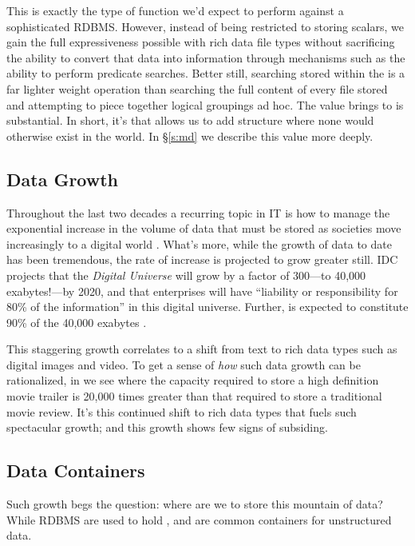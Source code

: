 This is exactly the type of function we'd expect to perform against a sophisticated RDBMS. However, instead of being restricted to storing scalars, we gain the full expressiveness possible with rich data file types without sacrificing the ability to convert that data into information through mechanisms such as the ability to perform predicate searches. Better still, searching \md{} stored within the \os{} is a far lighter weight operation than searching the full content of every file stored and attempting to piece together logical groupings ad hoc. The value \md{} brings to \ud{} is substantial. In short, it's \md{} that allows us to add structure where none would otherwise exist in the \ud{} world. In \S\ref{s:md} we describe this value more deeply.

\subsection{Data Growth}
Throughout the last two decades a recurring topic in IT is how to manage the exponential increase in the volume of data that must be stored as societies move increasingly to a digital world \cite{Gartner:2010:IT}. What's more, while the growth of data to date has been tremendous, the rate of increase is projected to grow greater still. IDC projects that the \emph{ Digital Universe} will grow by a factor of 300---to 40,000 exabytes!---by 2020, and that enterprises will have ``liability or responsibility for 80\% of the information'' in this digital universe. Further, \ud{} is expected to constitute 90\% of the 40,000 exabytes \cite{IDC:2012:DigitalUniverse}.

This staggering growth correlates to a shift from text to rich data types such as digital images and video. To get a sense of \emph{how} such data growth can be rationalized, in \cite{RJP:2012:SDVSUD} we see where the capacity required to store a high definition movie trailer is 20,000 times greater than that required to store a traditional movie review. It's this continued shift to rich data types that fuels such spectacular growth; and this growth shows few signs of subsiding.

\subsection{Data Containers}\label{s:dc}
Such growth begs the question: where are we to store this mountain of data? While RDBMS are used to hold \sd{}, \fss{} and \oss{} are common containers for unstructured data.


